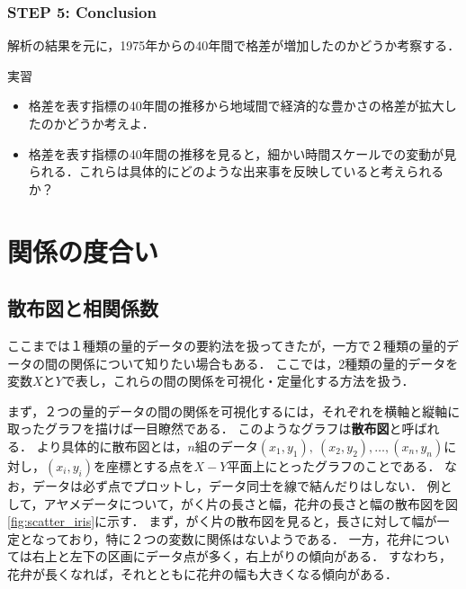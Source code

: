 \subsubsection*{STEP 5: Conclusion}
%
解析の結果を元に，1975年からの40年間で格差が増加したのかどうか考察する．
%

%
\begin{itembox}[l]{実習}
%
\begin{itemize}
\item
格差を表す指標の40年間の推移から地域間で経済的な豊かさの格差が拡大したのかどうか考えよ．
\item
格差を表す指標の40年間の推移を見ると，細かい時間スケールでの変動が見られる．これらは具体的にどのような出来事を反映していると考えられるか？
\end{itemize}
%
\end{itembox}
%


\clearpage
\section{関係の度合い}

\subsection{散布図と相関係数}
%
ここまでは１種類の量的データの要約法を扱ってきたが，一方で２種類の量的データの間の関係について知りたい場合もある．
%
ここでは，2種類の量的データを変数$ X $と$ Y $で表し，これらの間の関係を可視化・定量化する方法を扱う．
%

%
まず，２つの量的データの間の関係を可視化するには，それぞれを横軸と縦軸に取ったグラフを描けば一目瞭然である．
%
このようなグラフは\textbf{散布図}と呼ばれる．
%
より具体的に散布図とは，$ n $組のデータ$ (x_{1}, y_{1}),\ (x_{2}, y_{2}), \ldots, (x_{n}, y_{n}) $に対し，$ (x_{i}, y_{i}) $を座標とする点を$ X-Y $平面上にとったグラフのことである．
%
なお，データは必ず点でプロットし，データ同士を線で結んだりはしない．
%
例として，アヤメデータについて，がく片の長さと幅，花弁の長さと幅の散布図を図\ref{fig:scatter_iris}に示す．
%
まず，がく片の散布図を見ると，長さに対して幅が一定となっており，特に２つの変数に関係はないようである．
%
一方，花弁については右上と左下の区画にデータ点が多く，右上がりの傾向がある．
%
すなわち，花弁が長くなれば，それとともに花弁の幅も大きくなる傾向がある．
%

